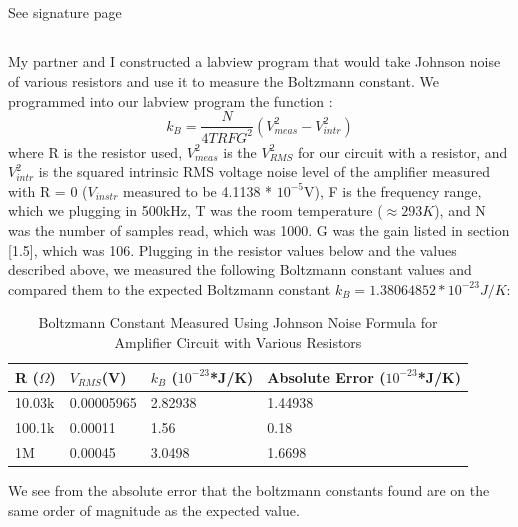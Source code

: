 \documentclass{article}
\begin{document}
\subsection{}
    See signature page
    
\subsection{}
    My partner and I constructed a labview program that would take Johnson noise of various resistors and use it to measure the Boltzmann constant. We programmed into our labview program the function \cite{lab9}:
    \begin{equation}
        k_B = \frac{N}{4TRFG^2}(V_{meas}^2 - V_{intr}^2)
    \end{equation}
    where R is the resistor used, $V_{meas}^2$ is the $V_{RMS}^2$ for our circuit with a resistor, and $V_{intr}^2$ is the squared intrinsic RMS voltage noise level of the amplifier measured with R = 0 ($V_{instr}$ measured to be 4.1138 * $10^{-5}$V), F is the frequency range, which we plugging in 500kHz, T was the room temperature ($\approx 293K$), and N was the number of samples read, which was 1000. G was the gain listed in section [1.5], which was 106. Plugging in the resistor values below and the values described above, we measured the following Boltzmann constant values and compared them to the expected Boltzmann constant $k_B = 1.38064852 * 10^{-23} J/K$:
    \begin{table}[H]
        \centering
        \caption{Boltzmann Constant Measured Using Johnson Noise Formula for Amplifier Circuit with Various Resistors}
        \label{my-label}
        \begin{tabular}{llll}
        \textbf{R ($\Omega$)} & \textbf{$V_{RMS}$(V)} & \textbf{$k_B$ ($10^{-23}$*J/K)} & \textbf{Absolute Error ($10^{-23}$*J/K)} \\ \hline
        10.03k & 0.00005965 & 2.82938 & 1.44938 \\
        100.1k & 0.00011 & 1.56 & 0.18 \\
        1M & 0.00045 & 3.0498 & 1.6698
        \end{tabular}
        \end{table}
    We see from the absolute error that the boltzmann constants found are on the same order of magnitude as the expected value.
    
\end{document}

